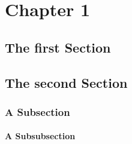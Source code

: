 \chapter{Chapter 1}
\blindtext[1]

\section{The first Section}
\blindtext[2]

\section{The second Section}
\blindtext[2]

\blindtext[1]

\subsection{A Subsection}

\subsubsection{A Subsubsection}
\blindtext[1]
